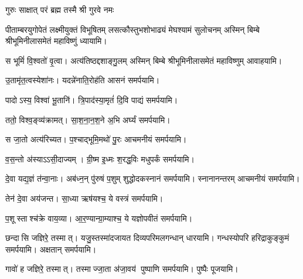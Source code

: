 {गुरुः साक्षात् परं ब्रह्म तस्मै श्री गुरवे नमः}

\begin{center}

{पीताम्बरयुगोपेतं लक्ष्मीयुक्तं विभूषितम्}
{लसत्कौस्तुभशोभाढ्यं मेघश्यामं सुलोचनम्}
अस्मिन् बिम्बे श्रीभूमिनीलासमेतं महाविष्णुं ध्यायामि।
\medskip

{स भूमिं॑ वि॒श्वतो॑ वृ॒त्वा। अत्य॑तिष्ठद्दशाङ्गु॒लम्}
अस्मिन् बिम्बे श्रीभूमिनीलासमेतं महाविष्णुम् आवाहयामि।
\medskip

 {उ॒तामृ॑त॒त्वस्येशा॑नः। यदन्ने॑नाति॒रोह॑ति}
 आसनं समर्पयामि।\medskip

{पादोऽस्य॒ विश्वा॑ भू॒तानि॑। त्रि॒पाद॑स्या॒मृतं॑ दि॒वि}
 पाद्यं समर्पयामि।\medskip
 
{ततो॒ विश्व॒ङ्व्य॑क्रामत्। सा॒श॒ना॒न॒श॒ने अ॒भि}
 अर्घ्यं समर्पयामि।\medskip

{स जा॒तो अत्य॑रिच्यत। प॒श्चाद्भूमि॒मथो॑ पु॒रः}
 आचमनीयं समर्पयामि।\medskip

{व॒स॒न्तो अ॑स्याऽऽसी॒दाज्यम्। ग्री॒ष्म इ॒ध्मः श॒रद्ध॒विः}
मधुपर्कं समर्पयामि।\medskip

 {दे॒वा यद्य॒ज्ञं त॑न्वा॒नाः। अब॑ध्न॒न् पु॑रुषं प॒शुम्}
 शुद्धोदकस्नानं समर्पयामि। स्नानानन्तरम् आचमनीयं समर्पयामि।\medskip

 {तेन॑ दे॒वा अय॑जन्त। सा॒ध्या ऋष॑यश्च॒ ये}
 वस्त्रं समर्पयामि।\medskip

{प॒शूस्ताश्च॑क्रे वाय॒व्या\sn{}। आ॒र॒ण्यान्ग्रा॒म्याश्च॒ ये}
 यज्ञोपवीतं समर्पयामि।\medskip

{छन्दासि जज्ञिरे॒ तस्मात्। यजु॒स्तस्मा॑दजायत}
 दिव्यपरिमलगन्धान् धारयामि। गन्धस्योपरि हरिद्राकुङ्कुमं समर्पयामि। अक्षतान् समर्पयामि।\medskip

{गावो॑ ह जज्ञिरे॒ तस्मात्। तस्माज्जा॒ता अ॑जा॒वय॑}
 पुष्पाणि समर्पयामि।  पुष्पैः पूजयामि।


\end{center}
